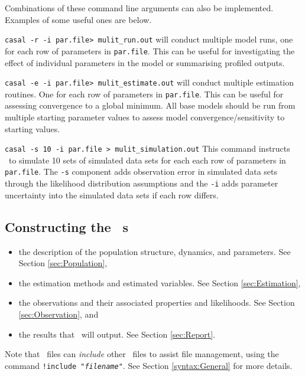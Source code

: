 %
Combinations of these command line arguments can also be implemented. Examples of some useful ones are below.
\begin{description}
	\item \texttt{casal -r -i par.file> mulit\_run.out} will conduct multiple model runs, one for each row of parameters in \texttt{par.file}. This can be useful for investigating the effect of individual parameters in the model or summarising profiled outputs.
	
	\item \texttt{casal -e -i par.file> mulit\_estimate.out} will conduct multiple estimation routines. One for each row of parameters in \texttt{par.file}. This can be useful for assessing convergence to a global minimum. All base models should be run from multiple starting parameter values to assess model convergence/sensitivity to starting values.
	
	\item \texttt{casal -s 10 -i par.file > mulit\_simulation.out} This command instructs \CNAME\ to simulate 10 sets of simulated data sets for each each row of parameters in \texttt{par.file}. The \texttt{-s} component adds observation error in simulated data sets through the likelihood distribution assumptions and the \texttt{-i} adds parameter uncertainty into the simulated data sets if each row differs.
\end{description}


\subsection{Constructing the \CNAME\ \config s \label{ConstructingConfig}}

\begin{itemize}
	\item the description of the population structure, dynamics, and parameters. See Section \ref{sec:Population},
	\item the estimation methods and estimated variables. See Section \ref{sec:Estimation},
	\item the observations and their associated properties and likelihoods. See Section \ref{sec:Observation}, and
	\item the results that \CNAME\ will output. See Section \ref{sec:Report}.
\end{itemize}

Note that \config\ files can \emph{include} other \config\ files to assist file management, using the command \texttt{!include "\emph{filename}"}. See Section \ref{syntax:General} for more details.

